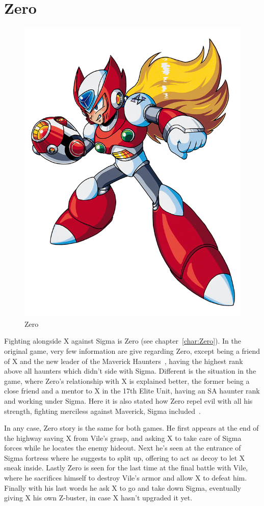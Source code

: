 \section{Zero}
\begin{figure}[htp]
	\centering
	\includegraphics[width=0.3\linewidth]{figures/X1/Zero_X1.png}
	\caption{Zero}
\end{figure}
Fighting alongside X against Sigma is Zero (see chapter~\ref{char:Zero}). In the original \x game, very few information are give regarding Zero, except being a friend of X and the new leader of the Maverick Haunters~\cite{X:Manual}, having the highest rank above all haunters which didn't side with Sigma. 
Different is the situation in the \mhx game, where Zero's relationship with X is explained better, the former being a close friend and a mentor to X in the 17th Elite Unit, having an SA haunter rank and working under Sigma. Here it is also stated how Zero repel evil with all his strength, fighting merciless against Maverick, Sigma included~\cite{Xcoll1:Manual_X1}.  

In any case, Zero story is the same for both games. He first appears at the end of the highway saving X from Vile's grasp, and asking X to take care of Sigma forces while he locates the enemy hideout. Next he's seen at the entrance of Sigma fortress where he suggests to split up, offering to act as decoy to let X sneak inside. Lastly Zero is seen for the last time at the final battle with Vile, where he sacrifices himself to destroy Vile's armor and allow X to defeat him. Finally with his last words he ask X to go and take down Sigma, eventually giving X his own Z-buster, in case X hasn't upgraded it yet.

